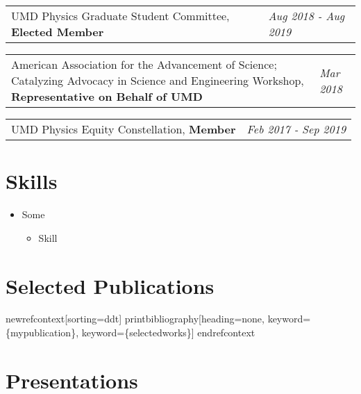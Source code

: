 \documentclass[
  10pt,
  letterpaper,
  DIV=11,
  numbers=noendperiod]{scrartcl}
\providecommand{\tightlist}{%
  \setlength{\itemsep}{0pt}\setlength{\parskip}{0pt}}\usepackage{longtable,booktabs,array}
\begin{document}
\begin{tabularx}{\textwidth}{>{\RaggedRight}p{}  >{\RaggedLeft}X} UMD Physics Graduate Student Committee, \textbf{Elected Member} & \textcolor{mygray}{\textit{Aug 2018 - Aug 2019}}  \end{tabularx}

\begin{tabularx}{\textwidth}{>{\RaggedRight}p{}  >{\RaggedLeft}X} American Association for the Advancement of Science; Catalyzing Advocacy in Science and Engineering Workshop, \textbf{Representative on Behalf of UMD} & \textcolor{mygray}{\textit{Mar 2018}}  \end{tabularx}

\begin{tabularx}{\textwidth}{>{\RaggedRight}p{}  >{\RaggedLeft}X} UMD Physics Equity Constellation, \textbf{Member} & \textcolor{mygray}{\textit{Feb 2017 - Sep 2019}}  \end{tabularx}

\hypertarget{fa-tools-skills}{%
\section{\texorpdfstring{
Skills}{ Skills}}\label{fa-tools-skills}}

\begin{itemize}
\tightlist
\item
  Some

  \begin{itemize}
  \tightlist
  \item
    Skill
  \end{itemize}
\end{itemize}

\hypertarget{fa-pen-nib-selected-publications}{%
\section{\texorpdfstring{ Selected
Publications}{ Selected Publications}}\label{fa-pen-nib-selected-publications}}

newrefcontext{[}sorting=ddt{]} printbibliography{[}heading=none,
keyword=\{mypublication\}, keyword=\{selectedworks\}{]} endrefcontext

\hypertarget{fa-chart-bar-presentations}{%
\section{\texorpdfstring{
Presentations}{ Presentations}}\label{fa-chart-bar-presentations}}
\end{document}

